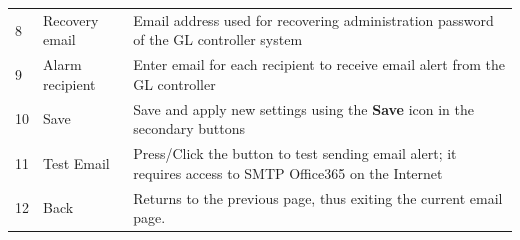 \begin{longtable}[]{@{}|l|l|l|@{}}
\begin{minipage}[t]{0.04\columnwidth}\raggedright
8\strut
\end{minipage} & \begin{minipage}[t]{0.23\columnwidth}\raggedright
Recovery email\strut
\end{minipage} & \begin{minipage}[t]{0.65\columnwidth}\raggedright
Email address used for recovering administration password of the GL
controller system\strut
\end{minipage}\tabularnewline
\begin{minipage}[t]{0.04\columnwidth}\raggedright
9\strut
\end{minipage} & \begin{minipage}[t]{0.23\columnwidth}\raggedright
Alarm recipient\strut
\end{minipage} & \begin{minipage}[t]{0.65\columnwidth}\raggedright
Enter email for each recipient to receive email alert from the GL
controller\strut
\end{minipage}\tabularnewline
\begin{minipage}[t]{0.04\columnwidth}\raggedright
10\strut
\end{minipage} & \begin{minipage}[t]{0.23\columnwidth}\raggedright
Save\strut
\end{minipage} & \begin{minipage}[t]{0.65\columnwidth}\raggedright
Save and apply new settings using the \textbf{Save} icon in the
secondary buttons\strut
\end{minipage}\tabularnewline
\begin{minipage}[t]{0.04\columnwidth}\raggedright
11\strut
\end{minipage} & \begin{minipage}[t]{0.23\columnwidth}\raggedright
Test Email\strut
\end{minipage} & \begin{minipage}[t]{0.65\columnwidth}\raggedright
Press/Click the button to test sending email alert; it requires access
to SMTP Office365 on the Internet\strut
\end{minipage}\tabularnewline
\begin{minipage}[t]{0.04\columnwidth}\raggedright
12\strut
\end{minipage} & \begin{minipage}[t]{0.23\columnwidth}\raggedright
Back\strut
\end{minipage} & \begin{minipage}[t]{0.65\columnwidth}\raggedright
Returns to the previous page, thus exiting the current email page.\strut
\end{minipage}\tabularnewline
\bottomrule
\end{longtable}


